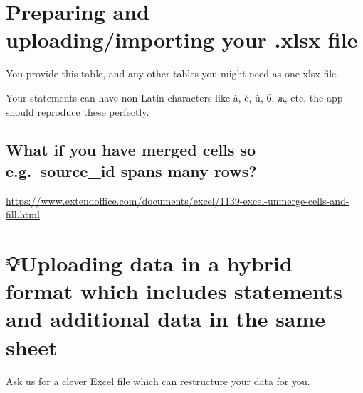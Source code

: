 \documentclass[
]{book}
\begin{document}
\hypertarget{preparing-and-uploadingimporting-your-.xlsx-file}{%
\section{Preparing and uploading/importing your .xlsx file}\label{preparing-and-uploadingimporting-your-.xlsx-file}}

You provide this table, and any other tables you might need as one xlsx file.

Your statements can have non-Latin characters like à, è, ù, б, ж, etc, the app should reproduce these perfectly.

\hypertarget{what-if-you-have-merged-cells-so-e.g.-source_id-spans-many-rows}{%
\subsection{What if you have merged cells so e.g.~source\_id spans many rows?}\label{what-if-you-have-merged-cells-so-e.g.-source_id-spans-many-rows}}

\url{https://www.extendoffice.com/documents/excel/1139-excel-unmerge-cells-and-fill.html}

\hypertarget{uploading-data-in-a-hybrid-format-which-includes-statements-and-additional-data-in-the-same-sheet}{%
\section{💡Uploading data in a hybrid format which includes statements and additional data in the same sheet}\label{uploading-data-in-a-hybrid-format-which-includes-statements-and-additional-data-in-the-same-sheet}}

Ask us for a clever Excel file which can restructure your data for you.
\end{document}
